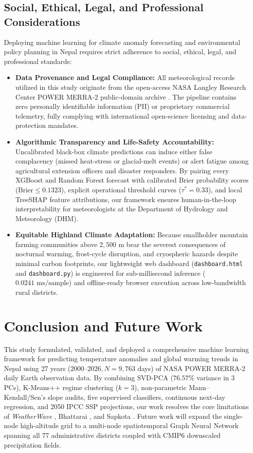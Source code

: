 \documentclass[conference]{IEEEtran}
\begin{document}
\subsection{Social, Ethical, Legal, and Professional Considerations}
Deploying machine learning for climate anomaly forecasting and environmental policy planning in Nepal requires strict adherence to social, ethical, legal, and professional standards:
\begin{itemize}
    \item \textbf{Data Provenance and Legal Compliance:} All meteorological records utilized in this study originate from the open-access NASA Langley Research Center POWER MERRA-2 public-domain archive \cite{nasa2026}. The pipeline contains zero personally identifiable information (PII) or proprietary commercial telemetry, fully complying with international open-science licensing and data-protection mandates.
    \item \textbf{Algorithmic Transparency and Life-Safety Accountability:} Uncalibrated black-box climate predictions can induce either false complacency (missed heat-stress or glacial-melt events) or alert fatigue among agricultural extension officers and disaster responders. By pairing every XGBoost and Random Forest forecast with calibrated Brier probability scores ($\text{Brier} \le 0.1323$), explicit operational threshold curves ($\tau^* = 0.33$), and local TreeSHAP feature attributions, our framework ensures human-in-the-loop interpretability for meteorologists at the Department of Hydrology and Meteorology (DHM).
    \item \textbf{Equitable Highland Climate Adaptation:} Because smallholder mountain farming communities above $2,500\text{ m}$ bear the severest consequences of nocturnal warming, frost-cycle disruption, and cryospheric hazards despite minimal carbon footprints, our lightweight web dashboard (\texttt{dashboard.html} and \texttt{dashboard.py}) is engineered for sub-millisecond inference ($0.0241\text{ ms/sample}$) and offline-ready browser execution across low-bandwidth rural districts.
\end{itemize}

\section{Conclusion and Future Work}
This study formulated, validated, and deployed a comprehensive machine learning framework for predicting temperature anomalies and global warming trends in Nepal using 27 years ($2000\text{--}2026, N = 9,763$ days) of NASA POWER MERRA-2 daily Earth observation data. By combining SVD-PCA ($76.57\%$ variance in 3 PCs), K-Means++ regime clustering ($k=3$), non-parametric Mann--Kendall/Sen's slope audits, five supervised classifiers, continuous next-day regression, and 2050 IPCC SSP projections, our work resolves the core limitations of \textit{WeatherWave} \cite{nepal2025}, Bhattarai \cite{bhattarai2022}, and Sapkota \cite{sapkota2007}. Future work will expand the single-node high-altitude grid to a multi-node spatiotemporal Graph Neural Network spanning all 77 administrative districts coupled with CMIP6 downscaled precipitation fields.
\end{document}
